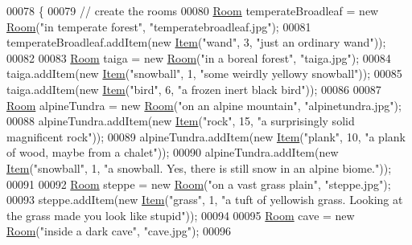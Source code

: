 \begin{DoxyCode}
00078                                \{
00079         \textcolor{comment}{// create the rooms}
00080         \hyperlink{classRoom}{Room} temperateBroadleaf = \textcolor{keyword}{new} \hyperlink{classRoom}{Room}(\textcolor{stringliteral}{"in temperate forest"}, \textcolor{stringliteral}{"temperatebroadleaf.jpg"});
00081         temperateBroadleaf.addItem(\textcolor{keyword}{new} \hyperlink{classItem}{Item}(\textcolor{stringliteral}{"wand"}, 3, \textcolor{stringliteral}{"just an ordinary wand"}));
00082 
00083         \hyperlink{classRoom}{Room} taiga = \textcolor{keyword}{new} \hyperlink{classRoom}{Room}(\textcolor{stringliteral}{"in a boreal forest"}, \textcolor{stringliteral}{"taiga.jpg"});
00084         taiga.addItem(\textcolor{keyword}{new} \hyperlink{classItem}{Item}(\textcolor{stringliteral}{"snowball"}, 1, \textcolor{stringliteral}{"some weirdly yellowy snowball"}));
00085         taiga.addItem(\textcolor{keyword}{new} \hyperlink{classItem}{Item}(\textcolor{stringliteral}{"bird"}, 6, \textcolor{stringliteral}{"a frozen inert black bird"}));
00086 
00087         \hyperlink{classRoom}{Room} alpineTundra = \textcolor{keyword}{new} \hyperlink{classRoom}{Room}(\textcolor{stringliteral}{"on an alpine mountain"}, \textcolor{stringliteral}{"alpinetundra.jpg"});
00088         alpineTundra.addItem(\textcolor{keyword}{new} \hyperlink{classItem}{Item}(\textcolor{stringliteral}{"rock"}, 15, \textcolor{stringliteral}{"a surprisingly solid magnificent rock"}));
00089         alpineTundra.addItem(\textcolor{keyword}{new} \hyperlink{classItem}{Item}(\textcolor{stringliteral}{"plank"}, 10, \textcolor{stringliteral}{"a plank of wood, maybe from a chalet"}));
00090         alpineTundra.addItem(\textcolor{keyword}{new} \hyperlink{classItem}{Item}(\textcolor{stringliteral}{"snowball"}, 1, \textcolor{stringliteral}{"a snowball. Yes, there is still snow in an alpine
       biome."}));
00091 
00092         \hyperlink{classRoom}{Room} steppe = \textcolor{keyword}{new} \hyperlink{classRoom}{Room}(\textcolor{stringliteral}{"on a vast grass plain"}, \textcolor{stringliteral}{"steppe.jpg"});
00093         steppe.addItem(\textcolor{keyword}{new} \hyperlink{classItem}{Item}(\textcolor{stringliteral}{"grass"}, 1, \textcolor{stringliteral}{"a tuft of yellowish grass. Looking at the grass made you
       look like stupid"}));
00094 
00095         \hyperlink{classRoom}{Room} cave = \textcolor{keyword}{new} \hyperlink{classRoom}{Room}(\textcolor{stringliteral}{"inside a dark cave"}, \textcolor{stringliteral}{"cave.jpg"});
00096 

\end{DoxyCode}
